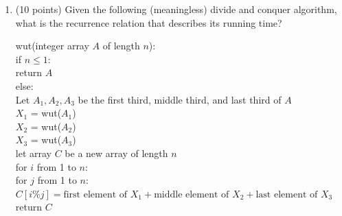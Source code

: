 \documentclass[11pt]{article}
\begin{document}
\begin{enumerate}
    \begin{algo}
    Algorithm-1(array $A$ of length $n$):\+\\
    Result = 0\\
    For each $i$ in $1$ to $n$:\+\\
    For each $j$ in $1$ to $i$:\+\\
    Set Result to $A[j]$ times Result\-\- \\
    Return Result\\
    \end{algo} 

\begin{enumerate}[A.]
    \item $n$
    \item $\log n$
    \item $n^2$
    \item $n^3$
    \item $n!$
\end{enumerate}
\newpage

\begin{center}
\LARGE\textbf{Section 3 (Recursion)\\}%
\end{center}

\subsection*{From Fall 2025 Exam 2}
\item (10 points) Given the following (meaningless) divide and conquer algorithm,
what is the recurrence relation that describes its running time?

    \begin{algo}
    wut(integer array $A$ of length $n$): \+ \\
    if $n \leq 1$:\+\\
        return $A$\-\\
    else:\+\\
    Let $A_1, A_2, A_3$ be the first third, middle third, and last third of $A$\\
    $X_1$ = wut($A_1$)\\
    $X_2$ = wut($A_2$)\\
    $X_3$ = wut($A_3$)\\
    let array $C$ be a new array of length $n$\\
    for $i$ from 1 to $n$:\+\\
        for $j$ from 1 to $n$:\+\\
            $C[i \% j] = \textrm{first element of } X_1 + \textrm{middle element of
            }X_2 +\textrm{last element of } X_3$\-\-\\
    return $C$\-\\
    \end{algo}


\end{enumerate}
\end{document}
